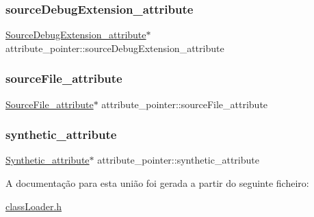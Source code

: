 \hypertarget{unionattribute__pointer_a7376f6951c39fcde10a0b233e20e00e0}{}\label{unionattribute__pointer_a7376f6951c39fcde10a0b233e20e00e0} 
\subsubsection{\texorpdfstring{source\+Debug\+Extension\+\_\+attribute}{sourceDebugExtension\_attribute}}
{\footnotesize\ttfamily \hyperlink{struct_source_debug_extension__attribute}{Source\+Debug\+Extension\+\_\+attribute}$\ast$ attribute\+\_\+pointer\+::source\+Debug\+Extension\+\_\+attribute}

\hypertarget{unionattribute__pointer_a709f793cbbe1f5058a168d970211292a}{}\label{unionattribute__pointer_a709f793cbbe1f5058a168d970211292a} 
\subsubsection{\texorpdfstring{source\+File\+\_\+attribute}{sourceFile\_attribute}}
{\footnotesize\ttfamily \hyperlink{struct_source_file__attribute}{Source\+File\+\_\+attribute}$\ast$ attribute\+\_\+pointer\+::source\+File\+\_\+attribute}

\hypertarget{unionattribute__pointer_a401c47044c8871e4c8f5a6db9d8d8139}{}\label{unionattribute__pointer_a401c47044c8871e4c8f5a6db9d8d8139} 
\subsubsection{\texorpdfstring{synthetic\+\_\+attribute}{synthetic\_attribute}}
{\footnotesize\ttfamily \hyperlink{struct_synthetic__attribute}{Synthetic\+\_\+attribute}$\ast$ attribute\+\_\+pointer\+::synthetic\+\_\+attribute}



A documentação para esta união foi gerada a partir do seguinte ficheiro\+:\begin{DoxyCompactItemize}
\item 
\hyperlink{class_loader_8h}{class\+Loader.\+h}\end{DoxyCompactItemize}
